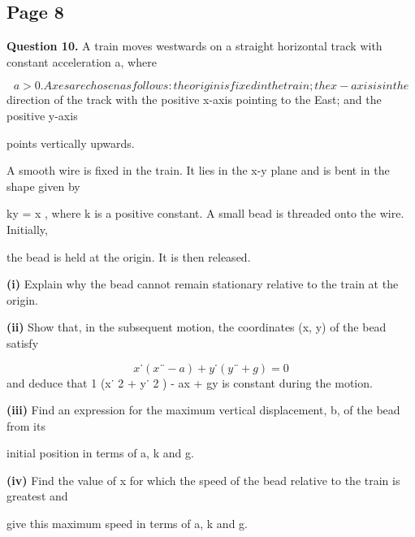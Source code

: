 \documentclass[12pt]{article}
\begin{document}
\subsection*{Page 8}
\begin{flushleft}
\bigskip\textbf{Question 10.} A train moves westwards on a straight horizontal track with constant acceleration a, where\par
\[a > 0. Axes are chosen as follows: the origin is fixed in the train; the x-axis is in the\]
direction of the track with the positive x-axis pointing to the East; and the positive y-axis\par
points vertically upwards.\par
A smooth wire is fixed in the train. It lies in the x-y plane and is bent in the shape given by\par
ky = x , where k is a positive constant. A small bead is threaded onto the wire. Initially,\par
the bead is held at the origin. It is then released.\par
\textbf{(i)} Explain why the bead cannot remain stationary relative to the train at the origin.\par
\textbf{(ii)} Show that, in the subsequent motion, the coordinates (x, y) of the bead satisfy\par
\[x˙ (x¨ - a) + y˙(y¨ + g) = 0\]
and deduce that 1 (x˙ 2 + y˙ 2 ) - ax + gy is constant during the motion.\par
\textbf{(iii)} Find an expression for the maximum vertical displacement, b, of the bead from its\par
initial position in terms of a, k and g.\par
\textbf{(iv)} Find the value of x for which the speed of the bead relative to the train is greatest and\par
give this maximum speed in terms of a, k and g.\par
\end{flushleft}
\end{document}
